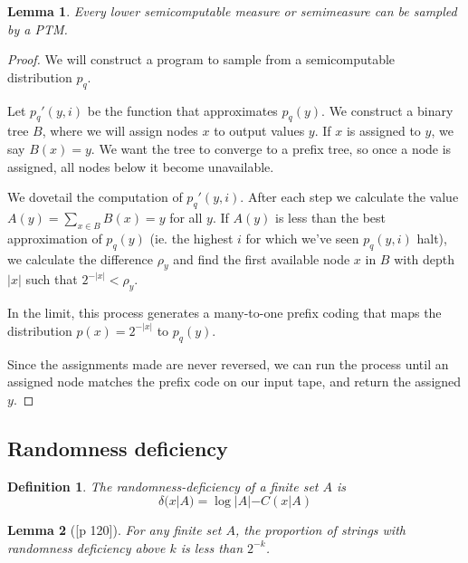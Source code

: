 \documentclass[10pt,a4paper,oneside]{article}
\newtheorem{lma}{Lemma}
\newtheorem{dfn}{Definition}
\begin{document}
\begin{lma}
Every lower semicomputable measure or semimeasure can be sampled by a PTM.
\end{lma}
\begin{proof}
We will construct a program to sample from a semicomputable distribution $p_q$. 

Let $p_q'(y, i)$ be the function that approximates $p_q(y)$. We construct a binary tree $B$, where we will assign nodes $x$ to output values $y$. If $x$ is assigned to $y$, we say $B(x) = y$. We want the tree to converge to a prefix tree, so once a node is assigned, all nodes below it become unavailable. 

We dovetail the computation of $p_q'(y, i)$. After each step we calculate the value $A(y) = \sum_{x \in B} B(x) = y$ for all $y$. If $A(y)$ is less than the best approximation of $p_q(y)$ (ie. the highest $i$ for which we've seen $p_q(y, i)$ halt), we calculate the difference $\rho_y$ and find the first available node $x$ in $B$ with depth $|x|$ such that $2^{-|x|} < \rho_y$.

In the limit, this process generates a many-to-one prefix coding that maps the distribution $p(x) = 2^{-|x|}$ to $p_q(y)$.

Since the assignments made are never reversed, we can run the process until an assigned node matches the prefix code on our input tape, and return the assigned $y$.
  
\end{proof}

\subsection*{Randomness deficiency}

\begin{dfn}
The randomness-deficiency of a finite set $A$ is 
\[
\delta(x|A) = \log |A| - C(x|A)
\]
\end{dfn}

\begin{lma}[{\cite{li1993introduction}[p 120]}]
For any finite set $A$, the proportion of strings with randomness deficiency above $k$ is less than $2^{-k}$. 

\label{lma:rd-finitesets}
\end{lma}
\end{document}
